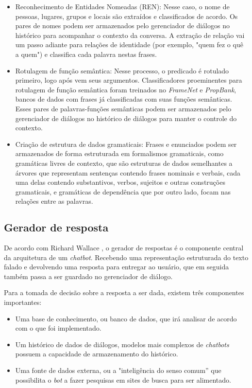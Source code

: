 \documentclass[
	12pt,				%
	oneside,
	a4paper,			%
	english,			%
	french,				%
	spanish,			%
	brazil				%
	]{abntex2}
\begin{document}
\begin{itemize}
	\item Reconhecimento de Entidades Nomeadas (REN): Nesse caso, o nome de pessoas, lugares, grupos e locais são extraídos e classificados de acordo. Os pares de nomes podem ser armazenados pelo gerenciador de diálogos no histórico para acompanhar o contexto da conversa. A extração de relação vai um passo adiante para relações de identidade (por exemplo, "quem fez o quê a quem") e classifica cada palavra nestas frases.
	\item Rotulagem de função semântica: Nesse processo, o predicado é rotulado primeiro, logo após vem seus argumentos. Classificadores proeminentes para rotulagem de função semântica foram treinados no \emph{FrameNet} e \emph{PropBank}, bancos de dados com frases já classificadas com suas funções semânticas. Esses pares de palavras-funções semânticas podem ser armazenados pelo gerenciador de diálogos no histórico de diálogos para manter o controle do contexto.
	\item Criação de estrutura de dados gramaticais: Frases e enunciados podem ser armazenados de forma estruturada em formalismos gramaticais, como gramáticas livres de contexto, que são estruturas de dados semelhantes a árvores que representam sentenças contendo frases nominais e verbais, cada uma delas contendo substantivos, verbos, sujeitos e outras construções gramaticais, e gramáticas de dependência que por outro lado, focam nas relações entre as palavras. 
\end{itemize}


\subsection{Gerador de resposta}
De acordo com Richard Wallace \supercite{response-generator}, o gerador de respostas é o componente central da arquitetura de um \emph{chatbot}. Recebendo uma representação estruturada do texto falado e devolvendo uma resposta para entregar ao usuário, que em seguida também passa a ser guardado no gerenciador de diálogo.

Para a tomada de decisão sobre a resposta a ser dada, existem três componentes importantes:
\begin{itemize}
	\item Uma base de conhecimento, ou banco de dados, que irá analisar de acordo com o que foi implementado.
	\item Um histórico de dados de diálogos, modelos mais complexos de \emph{chatbots} possuem a capacidade de armazenamento do histórico.
	\item Uma fonte de dados externa, ou a "inteligência do senso comum” que possibilita o \emph{bot} a fazer pesquisas em sites de busca para ser alimentado.
\end{itemize}
\end{document}
